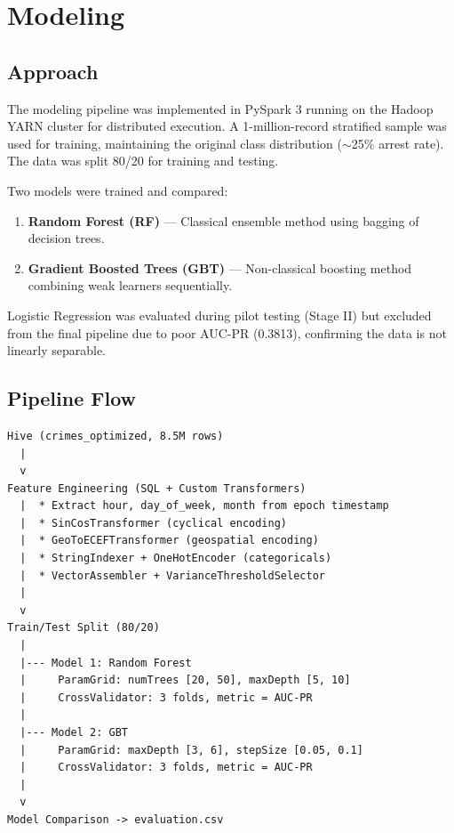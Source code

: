 \section{Modeling}
\label{sec:modeling}

\subsection{Approach}

The modeling pipeline was implemented in PySpark 3 running on the Hadoop YARN cluster for distributed execution. A 1-million-record stratified sample was used for training, maintaining the original class distribution ($\sim$25\% arrest rate). The data was split 80/20 for training and testing.

Two models were trained and compared:

\begin{enumerate}
    \item \textbf{Random Forest (RF)} — Classical ensemble method using bagging of decision trees.
    \item \textbf{Gradient Boosted Trees (GBT)} — Non-classical boosting method combining weak learners sequentially.
\end{enumerate}

Logistic Regression was evaluated during pilot testing (Stage II) but excluded from the final pipeline due to poor AUC-PR (0.3813), confirming the data is not linearly separable.

\subsection{Pipeline Flow}

\begin{verbatim}
Hive (crimes_optimized, 8.5M rows)
  |
  v
Feature Engineering (SQL + Custom Transformers)
  |  * Extract hour, day_of_week, month from epoch timestamp
  |  * SinCosTransformer (cyclical encoding)
  |  * GeoToECEFTransformer (geospatial encoding)
  |  * StringIndexer + OneHotEncoder (categoricals)
  |  * VectorAssembler + VarianceThresholdSelector
  |
  v
Train/Test Split (80/20)
  |
  |--- Model 1: Random Forest
  |     ParamGrid: numTrees [20, 50], maxDepth [5, 10]
  |     CrossValidator: 3 folds, metric = AUC-PR
  |
  |--- Model 2: GBT
  |     ParamGrid: maxDepth [3, 6], stepSize [0.05, 0.1]
  |     CrossValidator: 3 folds, metric = AUC-PR
  |
  v
Model Comparison -> evaluation.csv
\end{verbatim}

